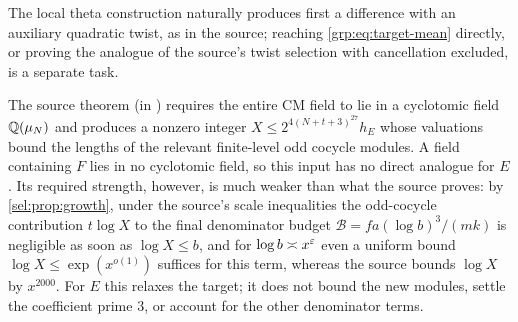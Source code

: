 The local theta construction naturally produces first a difference with an
auxiliary quadratic twist, as in the source; reaching
\eqref{grp:eq:target-mean} directly, or proving the analogue of the source's
twist selection with cancellation excluded, is a separate task.

The source theorem  (in
) requires the entire CM field to lie in a
cyclotomic field $\mathbb{Q}(\mu_N)$ and produces a nonzero integer
$X\le2^{4(N+t+3)^{27}}h_E$ whose valuations bound the lengths of the relevant
finite-level odd cocycle modules. A field containing $F$ lies in no cyclotomic
field, so this input has no direct analogue for $E$. Its required strength,
however, is much weaker than what the source proves: by
\cref{sel:prop:growth}, under the source's scale inequalities the odd-cocycle
contribution $t\log X$ to the final denominator budget
$\mathcal B=fa(\log b)^3/(mk)$ is negligible as soon as $\log X\le b$, and for
$\log b\asymp x^\varepsilon$ even a uniform bound $\log X\le\exp(x^{o(1)})$ suffices
for this term, whereas the source bounds $\log X$ by $x^{2000}$. For $E$ this
relaxes the target; it does not bound the new modules, settle the coefficient
prime $3$, or account for the other denominator terms.

